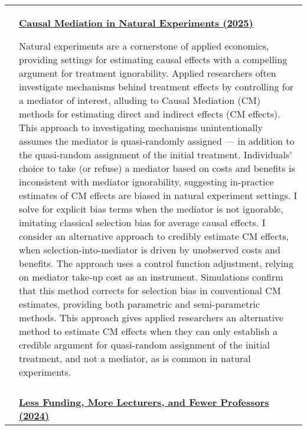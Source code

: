\documentclass[letterpaper,11pt,oneside]{article}
\begin{document}
\begin{longtable}[\textwidth]{p{} p{}}
    & \textbf{\href{https://raw.githubusercontent.com/shoganhennessy/mediation-natural-experiment/main/mediation-natural-experiment-2025.pdf}{
        Causal Mediation in Natural Experiments (2025)}}

    Natural experiments are a cornerstone of applied economics, providing settings for estimating causal effects with a compelling argument for treatment ignorability.
    Applied researchers often investigate mechanisms behind treatment effects by controlling for a mediator of interest, alluding to Causal Mediation (CM) methods for estimating direct and indirect effects (CM effects).
    This approach to investigating mechanisms unintentionally assumes the mediator is quasi-randomly assigned --- in addition to the quasi-random assignment of the initial treatment.
    Individuals' choice to take (or refuse) a mediator based on costs and benefits is inconsistent with mediator ignorability, suggesting in-practice estimates of CM effects are biased in natural experiment settings.
    I solve for explicit bias terms when the mediator is not ignorable, imitating classical selection bias for average causal effects.
    I consider an alternative approach to credibly estimate CM effects, when selection-into-mediator is driven by unobserved costs and benefits.
    The approach uses a control function adjustment, relying on mediator take-up cost as an instrument.
    Simulations confirm that this method corrects for selection bias in conventional CM estimates, providing both parametric and semi-parametric methods.
    This approach gives applied researchers an alternative method to estimate CM effects when they can only establish a credible argument for quasi-random assignment of the initial treatment, and not a mediator, as is common in natural experiments. \\ \\

    & \textbf{\href{https://raw.githubusercontent.com/shoganhennessy/state-funding-faculty/main/state-funding-faculty-2024.pdf}{
        Less Funding, More Lecturers, and Fewer Professors (2024)}}


\end{longtable}
\end{document}
